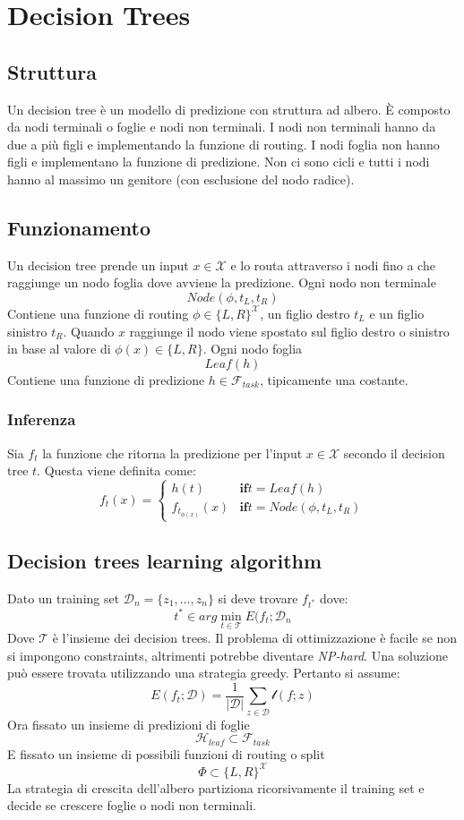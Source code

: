 \chapter{Decision Trees}

\section{Struttura}
Un decision tree \`e un modello di predizione con struttura ad albero.
\`E composto da nodi terminali o foglie e nodi non terminali.
I nodi non terminali hanno da due a pi\`u figli e implementando la funzione di routing.
I nodi foglia non hanno figli e implementano la funzione di predizione.
Non ci sono cicli e tutti i nodi hanno al massimo un genitore (con esclusione del nodo radice).

\section{Funzionamento}
Un decision tree prende un input $x\in\mathcal{X}$ e lo routa attraverso i nodi fino a che raggiunge un nodo foglia dove avviene la predizione.
Ogni nodo non terminale
$$Node(\phi, t_L, t_R)$$
Contiene una funzione di routing $\phi\in\{L, R\}^{\mathcal{X}}$, un figlio destro $t_L$ e un figlio sinistro $t_R$.
Quando $x$ raggiunge il nodo viene spostato sul figlio destro o sinistro in base al valore di $\phi(x)\in\{L,R\}$.
Ogni nodo foglia
$$Leaf(h)$$
Contiene una funzione di predizione $h\in\mathcal{F}_{task}$, tipicamente una costante.

	\subsection{Inferenza}
	Sia $f_t$ la funzione che ritorna la predizione per l'input $x\in\mathcal{X}$ secondo il decision tree $t$.
	Questa viene definita come:
	$$f_t(x)=\begin{cases}h(t)&\mathbf{if} t = Leaf(h)\\
										 f_{t_{\phi(x)}}(x)&\mathbf{if} t = Node(\phi, t_L, t_R)
				\end{cases}$$

\section{Decision trees learning algorithm}
Dato un training set $\mathcal{D}_n = \{z_1,\dots, z_n\}$ si deve trovare $f_{t^*}$ dove:
$$t^*\in arg\min\limits_{t\in\mathcal{T}} E(f_t;\mathcal{D}_n$$
Dove $\mathcal{T}$ \`e l'insieme dei decision trees.
Il problema di ottimizzazione \`e facile se non si impongono constraints, altrimenti potrebbe diventare \emph{NP-hard}.
Una soluzione pu\`o essere trovata utilizzando una strategia greedy.
Pertanto si assume:
$$E(f_t;\mathcal{D}) = \dfrac{1}{|\mathcal{D}|}\sum\limits_{z\in\mathcal{D}}\mathcal{l}(f;z)$$
Ora fissato un insieme di predizioni di foglie
$$\mathcal{H}_{leaf}\subset\mathcal{F}_{task}$$
E fissato un insieme di possibili funzioni di routing o split
$$\Phi\subset\{L,R\}^\mathcal{X}$$
La strategia di crescita dell'albero partiziona ricorsivamente il training set e decide se crescere foglie o nodi non terminali.

